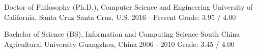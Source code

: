 

\begin{cventries}

  \cventry
    {Doctor of Philosophy (Ph.D.), Computer Science and Engineering} %
    {University of California, Santa Cruz} %
    {Santa Cruz, U.S.} %
    {2016 - Present} %
    {Grade: 3.95 / 4.00}

  \cventry
    {Bachelor of Science (BS), Information and Computing Science}
    {South China Agricultural University}
    {Guangzhou, China}
    {2006 - 2010}
    {Grade: 3.45 / 4.00}

\end{cventries}
